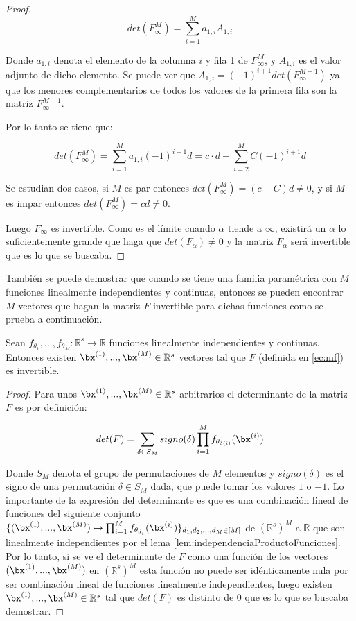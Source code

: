 \begin{proof}
$$
det(F^{M}_\infty) = \sum_{i=1}^{M} a_{1,i} A_{1,i}
$$

Donde $a_{1,i}$ denota el elemento de la columna $i$ y fila 1 de $F^{M}_\infty$, y $A_{1,i}$ es el valor adjunto de dicho elemento. Se puede ver que $A_{1,i} = (-1)^{i+1} det(F^{M-1}_\infty)$ ya que los menores complementarios de todos los valores de la primera fila son la matriz $F^{M-1}_\infty$. 

Por lo tanto se tiene que:

$$
det(F^{M}_\infty) = \sum_{i=1}^{M} a_{1,i} (-1)^{i+1} d = c\cdot d + \sum_{i=2}^{M} C (-1)^{i+1} d
$$

Se estudian dos casos, si $M$ es par entonces $det(F^{M}_\infty) = (c-C)d \neq 0$, y si $M$ es impar entonces $det(F^{M}_\infty)=cd \neq 0$.

Luego $F_\infty$ es invertible. Como es el límite cuando $\alpha$ tiende a $\infty$, existirá un $\alpha$ lo suficientemente grande que haga que $det(F_\alpha)\neq 0$ y la matriz $F_\alpha$ será invertible que es lo que se buscaba.

\end{proof}

También se puede demostrar que cuando se tiene una familia paramétrica con $M$ funciones linealmente independientes y continuas, entonces se pueden encontrar $M$ vectores que hagan la matriz $F$ invertible para dichas funciones como se prueba a continuación.


\begin{prop} \label{lem:vectoresPlantillaInversaF}
Sean $f_{\theta_1},...,f_{\theta_M}:\mathbb{R}^s\rightarrow\mathbb{R}$ funciones linealmente independientes y continuas. Entonces existen $\bx^{(1)},... ,\bx^{(M)}\in\mathbb{R}^s$ vectores tal que $F$ (definida en \eqref{ec:mf}) es invertible.
\end{prop}
\begin{proof}
Para unos $\bx^{(1)},... ,\bx^{(M)}\in\mathbb{R}^s$ arbitrarios el determinante de la matriz $F$ es por definición:

\begin{align*}
det(F) = \sum_{\delta\in S_M} signo(\delta)\prod_{i=1}^{M}f_{\theta_{\delta(i)}}(\bx^{(i)})
\end{align*}

Donde $S_M$ denota el grupo de permutaciones de $M$ elementos y $signo(\delta)$ es el signo de una permutación $\delta\in S_M$ dada, que puede tomar los valores $1$ o $-1$. Lo importante de la expresión del determinante es que es una combinación lineal de funciones del siguiente conjunto $\{(\bx^{(1)},... ,\bx^{(M)}) \mapsto \prod_{i=1}^{M}f_{\theta_{d_i}}(\bx^{(i)}) \}_{d_1,d_2,... ,d_M\in[M]}$ de $(\mathbb{R}^s)^M$ a $\mathbb{R}$ que son linealmente independientes por el lema \ref{lem:independenciaProductoFunciones}. Por lo tanto, si se ve el determinante de $F$ como una función de los vectores $(\bx^{(1)},... ,\bx^{(M)})$ en $(\mathbb{R}^s)^M$ esta función no puede ser idénticamente nula por ser combinación lineal de funciones linealmente independientes, luego existen $\bx^{(1)},... ,\bx^{(M)}\in\mathbb{R}^s$ tal que $det(F)$ es distinto de $0$ que es lo que se buscaba demostrar.
\end{proof}

